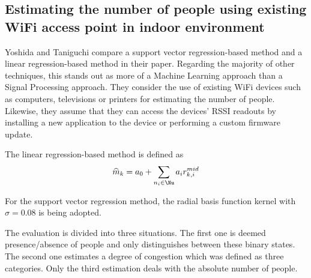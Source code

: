\documentclass[conference]{IEEEtran}
\begin{document}
\subsection{Estimating the number of people using existing WiFi access point in indoor environment}
Yoshida and Taniguchi \cite{Yoshida} compare a support vector regression-based method and a linear regression-based method in their paper. Regarding the majority of other techniques, this stands out as more of a Machine Learning approach than a Signal Processing approach. They consider the use of existing WiFi devices such as computers, televisions or printers for estimating the number of people. Likewise, they assume that they can access the devices' RSSI readouts by installing a new application to the device or performing a custom firmware update.
\par
The linear regression-based method is defined as
$$ \widehat{m}_{k} = a_0 + \sum\limits_{n_i \in \Nu} a_i r^{mid}_{k,i} $$

For the support vector regression method, the radial basis function kernel with $\sigma = 0.08$ is being adopted.
\par
The evaluation is divided into three situations. The first one is deemed presence/absence of people and only distinguishes between these binary states. The second one estimates a degree of congestion which was defined as three categories. Only the third estimation deals with the absolute number of people.
\end{document}
